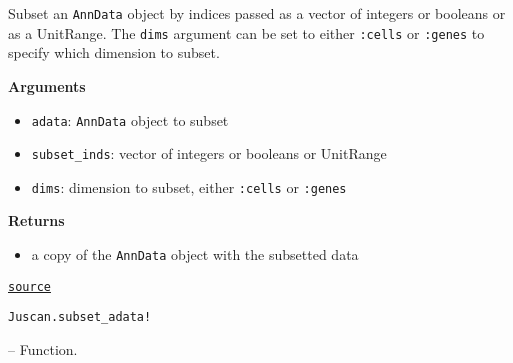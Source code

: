 \documentclass[oneside]{memoir}
\begin{document}
\begin{adjustwidth}{2em}{0pt}
Subset an \texttt{AnnData} object by indices passed as a vector of integers or booleans or as a UnitRange.  The \texttt{dims} argument can be set to either \texttt{:cells} or \texttt{:genes} to specify which dimension to subset. 

\textbf{Arguments}

\begin{itemize}
\item \texttt{adata}: \texttt{AnnData} object to subset


\item \texttt{subset\_inds}: vector of integers or booleans or UnitRange


\item \texttt{dims}: dimension to subset, either \texttt{:cells} or \texttt{:genes}

\end{itemize}
\textbf{Returns}

\begin{itemize}
\item a copy of the \texttt{AnnData} object with the subsetted data

\end{itemize}


\href{https://github.com/zehua0417/Juscan.jl/blob/393ad1b827b678ea98a738f92af658ee9ed9a403/src/anndata.jl#L215-L228}{\texttt{source}}


\end{adjustwidth}
\hypertarget{2261814719333819436}{\texttt{Juscan.subset\_adata!}}  -- {Function.}
\end{document}
